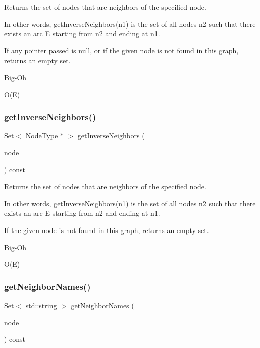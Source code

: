 Returns the set of nodes that are neighbors of the specified node. 

In other words, get\+Inverse\+Neighbors(n1) is the set of all nodes n2 such that there exists an arc E starting from n2 and ending at n1.

If any pointer passed is null, or if the given node is not found in this graph, returns an empty set. \begin{DoxyRefDesc}{Big-\/\+Oh}
\item[\mbox{\hyperlink{BigOh__BigOh000069}{Big-\/\+Oh}}]O(\+E) \end{DoxyRefDesc}
\mbox{\label{classGraph_a5294846b9cdd19394808e3736ec67004}} 
\subsubsection{\texorpdfstring{get\+Inverse\+Neighbors()}{getInverseNeighbors()}\hspace{0.1cm}{\footnotesize\ttfamily [2/2]}}
{\footnotesize\ttfamily \mbox{\hyperlink{classSet}{Set}}$<$ Node\+Type $\ast$ $>$ get\+Inverse\+Neighbors (\begin{DoxyParamCaption}\item[{const std\+::string \&}]{node }\end{DoxyParamCaption}) const}



Returns the set of nodes that are neighbors of the specified node. 

In other words, get\+Inverse\+Neighbors(n1) is the set of all nodes n2 such that there exists an arc E starting from n2 and ending at n1.

If the given node is not found in this graph, returns an empty set. \begin{DoxyRefDesc}{Big-\/\+Oh}
\item[\mbox{\hyperlink{BigOh__BigOh000070}{Big-\/\+Oh}}]O(\+E) \end{DoxyRefDesc}
\mbox{\label{classGraph_ae9b5cbd2bcb3918c4c64b1eb71c1a3a8}} 
\subsubsection{\texorpdfstring{get\+Neighbor\+Names()}{getNeighborNames()}\hspace{0.1cm}{\footnotesize\ttfamily [1/2]}}
{\footnotesize\ttfamily \mbox{\hyperlink{classSet}{Set}}$<$ std\+::string $>$ get\+Neighbor\+Names (\begin{DoxyParamCaption}\item[{Node\+Type $\ast$}]{node }\end{DoxyParamCaption}) const}



